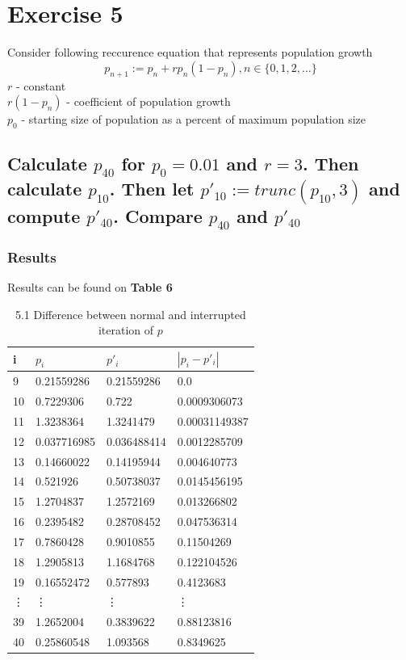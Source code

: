 \documentclass[11pt]{article}
\begin{document}
\section{Exercise 5}
Consider following reccurence equation that represents population growth
\begin{equation}
    p_{n+1} := p_n + rp_n(1-p_n), n \in \{0, 1, 2, \dots\}
\end{equation}
    $r$ - constant\\
    $r(1-p_n)$ - coefficient of population growth\\
    $p_0$ - starting size of population as a percent of maximum population size
\subsection{Calculate $p_{40}$ for $p_0=0.01$ and $r=3$. 
Then calculate $p_{10}$. Then let $p'_{10} := trunc(p_{10}, 3)$ and compute $p'_{40}$.
Compare $p_{40}$ and $p'_{40}$}
\subsubsection{Results}
Results can be found on \textbf{Table 6}
\begin{table}[h]
    \centering
    \caption{5.1 Difference between normal and interrupted iteration of $p$}
    \begin{tabular}{|l|l|l|l|}
    \hline
        i & $p_i$ & $p'_i$ & $|p_i - p'_i|$ \\ \hline
        9 & 0.21559286 & 0.21559286 & 0.0 \\ \hline
        10 & 0.7229306 & 0.722 & 0.0009306073 \\ \hline
        11 & 1.3238364 & 1.3241479 & 0.00031149387 \\ \hline
        12 & 0.037716985 & 0.036488414 & 0.0012285709 \\ \hline
        13 & 0.14660022 & 0.14195944 & 0.004640773 \\ \hline
        14 & 0.521926 & 0.50738037 & 0.0145456195 \\ \hline
        15 & 1.2704837 & 1.2572169 & 0.013266802 \\ \hline
        16 & 0.2395482 & 0.28708452 & 0.047536314 \\ \hline
        17 & 0.7860428 & 0.9010855 & 0.11504269 \\ \hline
        18 & 1.2905813 & 1.1684768 & 0.122104526 \\ \hline
        19 & 0.16552472 & 0.577893 & 0.4123683 \\ \hline
        \vdots & \vdots & \vdots & \vdots \\ \hline
        39 & 1.2652004 & 0.3839622 & 0.88123816 \\ \hline
        40 & 0.25860548 & 1.093568 & 0.8349625 \\ \hline
    \end{tabular}
\end{table}
\end{document}
